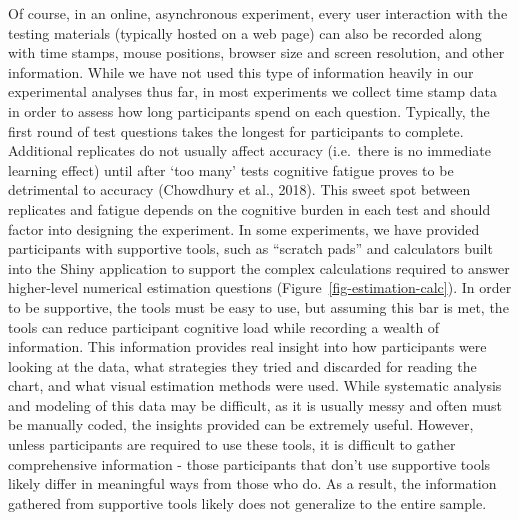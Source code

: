 \documentclass[
  10pt,
  letterpaper,
  DIV=11,
  numbers=noendperiod]{scrartcl}
\begin{document}
Of course, in an online, asynchronous experiment, every user interaction
with the testing materials (typically hosted on a web page) can also be
recorded along with time stamps, mouse positions, browser size and
screen resolution, and other information. While we have not used this
type of information heavily in our experimental analyses thus far, in
most experiments we collect time stamp data in order to assess how long
participants spend on each question. Typically, the first round of test
questions takes the longest for participants to complete. Additional
replicates do not usually affect accuracy (i.e.~there is no immediate
learning effect) until after `too many' tests cognitive fatigue proves
to be detrimental to accuracy (Chowdhury et al., 2018). This sweet spot
between replicates and fatigue depends on the cognitive burden in each
test and should factor into designing the experiment. In some
experiments, we have provided participants with supportive tools, such
as ``scratch pads'' and calculators built into the Shiny application to
support the complex calculations required to answer higher-level
numerical estimation questions (Figure~\ref{fig-estimation-calc}). In
order to be supportive, the tools must be easy to use, but assuming this
bar is met, the tools can reduce participant cognitive load while
recording a wealth of information. This information provides real
insight into how participants were looking at the data, what strategies
they tried and discarded for reading the chart, and what visual
estimation methods were used. While systematic analysis and modeling of
this data may be difficult, as it is usually messy and often must be
manually coded, the insights provided can be extremely useful. However,
unless participants are required to use these tools, it is difficult to
gather comprehensive information - those participants that don't use
supportive tools likely differ in meaningful ways from those who do. As
a result, the information gathered from supportive tools likely does not
generalize to the entire sample.
\end{document}

